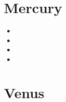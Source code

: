 

\section{Mercury}

\begin{scriptsize}
\begin{itemize}
\item[\twothousandseven] 
\item[\twothousandeight] 
\item[\twothousandtwelve] 
\item[\twothousandtwentyone] 
\end{itemize}
\end{scriptsize}

 
\section{Venus}


